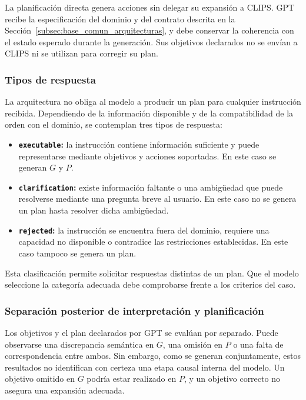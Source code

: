 La planificación directa genera acciones sin delegar su expansión a CLIPS. GPT recibe la especificación del dominio y del contrato descrita en la Sección~\ref{subsec:base_comun_arquitecturas}, y debe conservar la coherencia con el estado esperado durante la generación. Sus objetivos declarados no se envían a CLIPS ni se utilizan para corregir su plan.


\subsubsection{Tipos de respuesta}
\label{subsubsec:tipos_respuesta_gpt}

La arquitectura no obliga al modelo a producir un plan para cualquier
instrucción recibida. Dependiendo de la información disponible y de la
compatibilidad de la orden con el dominio, se contemplan tres tipos de
respuesta:

\begin{itemize}

    \item \textbf{\texttt{executable}:} la instrucción contiene información
    suficiente y puede representarse mediante objetivos y acciones soportadas.
    En este caso se generan $G$ y $P$.

    \item \textbf{\texttt{clarification}:} existe información faltante o una
    ambigüedad que puede resolverse mediante una pregunta breve al usuario. En
    este caso no se genera un plan hasta resolver dicha ambigüedad.

    \item \textbf{\texttt{rejected}:} la instrucción se encuentra fuera del
    dominio, requiere una capacidad no disponible o contradice las restricciones
    establecidas. En este caso tampoco se genera un plan.

\end{itemize}

Esta clasificación permite solicitar respuestas distintas de un plan. Que el modelo seleccione la categoría adecuada debe comprobarse frente a los criterios del caso.


\subsubsection{Separación posterior de interpretación y planificación}
\label{subsubsec:errores_gpt}

Los objetivos y el plan declarados por GPT se evalúan por separado. Puede observarse una discrepancia semántica en $G$, una omisión en $P$ o una falta de correspondencia entre ambos. Sin embargo, como se generan conjuntamente, estos resultados no identifican con certeza una etapa causal interna del modelo. Un objetivo omitido en $G$ podría estar realizado en $P$, y un objetivo correcto no asegura una expansión adecuada.

